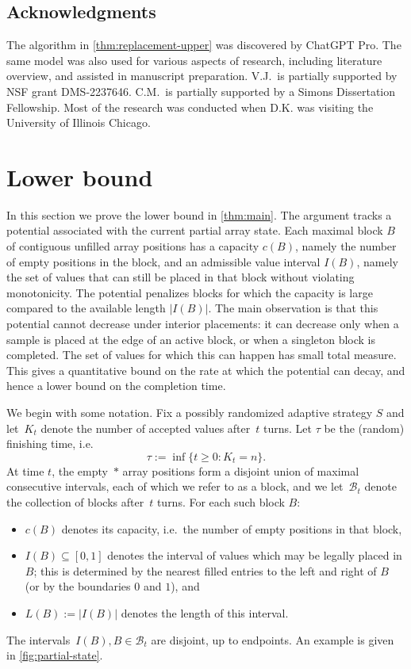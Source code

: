 \documentclass[11pt,reqno,letterpaper]{amsart}
\theoremstyle{definition}
\numberwithin{equation}{section}
\newcommand{\cB}{\mathcal{B}}
\newcommand{\mc}{\mathcal}
\begin{document}
\subsection{Acknowledgments} The algorithm in \cref{thm:replacement-upper} was discovered by ChatGPT Pro. The same model was also used for various aspects of research, including literature overview, and assisted in manuscript preparation. V.J.~is partially supported by NSF grant DMS-2237646. C.M.~is partially supported by a Simons Dissertation Fellowship. Most of the research was conducted when D.K. was visiting the University of Illinois Chicago.




\section{Lower bound}
\label{sec:lower}

In this section we prove the lower bound in \cref{thm:main}. The argument tracks a potential associated with the current partial array state. Each maximal block \(B\) of contiguous unfilled array positions has a capacity \(c(B)\), namely the number of empty positions in the block, and an admissible value interval \(I(B)\), namely the set of values that can still be placed in that block without violating monotonicity. The potential penalizes blocks for which the capacity is large compared to the available length \(|I(B)|\). The main observation is that this potential cannot decrease under interior placements: it can decrease only when a sample is placed at the edge of an active block, or when a singleton block is completed. The set of values for which this can happen has small total measure.  This gives a quantitative bound on the rate at which the potential can decay, and hence a lower bound on the completion time.

\medskip



We begin with some notation. Fix a possibly randomized adaptive strategy $S$ and let~$K_t$ denote the number of accepted values after~$t$ turns. Let $\tau$ be the (random) finishing time, i.e.
\[
\tau:=\inf\{t\ge 0:K_t=n\}.
\]
At time $t$, the empty~$*$ array positions form a disjoint union of maximal consecutive intervals, each of which we refer to as a block, and we let~$\cB_t$ denote the collection of blocks after~$t$ turns. For each such block $B$:
\begin{itemize}
\item $c(B)$ denotes its capacity, i.e.~the number of empty positions in that block,
\item $I(B)\subseteq [0,1]$ denotes the interval of values which may be legally placed in $B$; this is determined by the nearest filled entries to the left and right of $B$ (or by the boundaries $0$ and $1$), and
\item $L(B):=|I(B)|$ denotes the length of this interval.
\end{itemize}
The intervals~$I(B), B \in \mc{B}_t$ are disjoint, up to endpoints. An example is given in \cref{fig:partial-state}.
\end{document}
